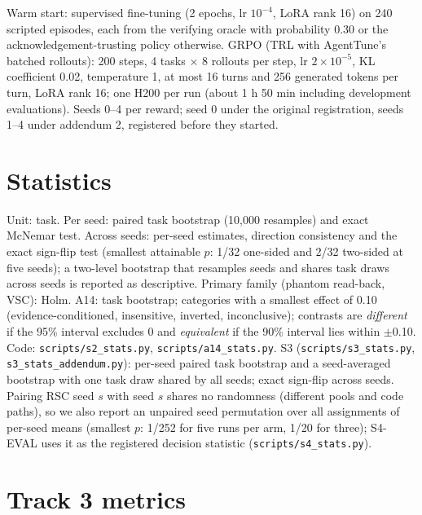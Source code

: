 Warm start: supervised fine-tuning (2 epochs, lr $10^{-4}$, LoRA rank 16) on 240 scripted episodes, each from the verifying oracle with probability 0.30 or the acknowledgement-trusting policy otherwise. GRPO (TRL with AgentTune's batched rollouts): 200 steps, 4 tasks $\times$ 8 rollouts per step, lr $2\times10^{-5}$, KL coefficient 0.02, temperature 1, at most 16 turns and 256 generated tokens per turn, LoRA rank 16; one H200 per run (about 1 h 50 min including development evaluations). Seeds 0--4 per reward; seed 0 under the original registration, seeds 1--4 under addendum 2, registered before they started.

\section{Statistics}
\label{app:stats}

Unit: task. Per seed: paired task bootstrap (10{,}000 resamples) and exact McNemar test. Across seeds: per-seed estimates, direction consistency and the exact sign-flip test (smallest attainable $p$: 1/32 one-sided and 2/32 two-sided at five seeds); a two-level bootstrap that resamples seeds and shares task draws across seeds is reported as descriptive. Primary family (phantom read-back, VSC): Holm. A14: task bootstrap; categories with a smallest effect of 0.10 (evidence-conditioned, insensitive, inverted, inconclusive); contrasts are \emph{different} if the 95\% interval excludes 0 and \emph{equivalent} if the 90\% interval lies within $\pm$0.10. Code: \texttt{scripts/s2\_stats.py}, \texttt{scripts/a14\_stats.py}. S3 (\texttt{scripts/s3\_stats.py}, \texttt{s3\_stats\_addendum.py}): per-seed paired task bootstrap and a seed-averaged bootstrap with one task draw shared by all seeds; exact sign-flip across seeds. Pairing RSC seed $s$ with \RV{} seed $s$ shares no randomness (different pools and code paths), so we also report an unpaired seed permutation over all assignments of per-seed means (smallest $p$: 1/252 for five runs per arm, 1/20 for three); S4-EVAL uses it as the registered decision statistic (\texttt{scripts/s4\_stats.py}).

\section{Track 3 metrics}
\label{app:track3}

\begin{table}[h]
\centering
\resizebox{\columnwidth}{!}{}
\caption{\texttt{proc\_conf}: verified completion next to claimed success (share of episodes reported \texttt{completed}); latency is batch-1 seconds per episode on 40 \texttt{proc\_dev} tasks (L40S). The gateway adds about 0.2\,ms per tool call (in process).}
\end{table}

